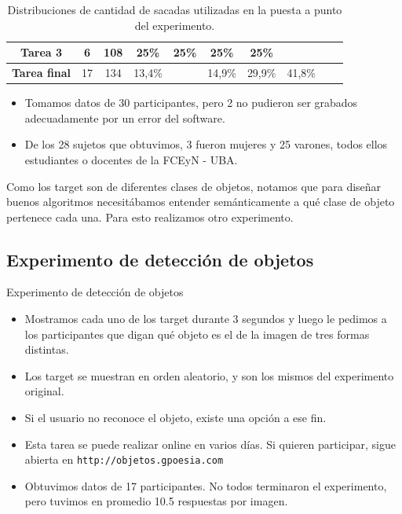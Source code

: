 \documentclass[compress]{beamer}
\begin{document}
\begin{frame}
\begin{table}[h]
\begin{tabular}{c|c|c|c|c|c|c|c|c|c|}
\multicolumn{1}{|c|}{\textbf{Tarea 3}}     & 6                                                                                        & 108                                                                                                  & 25\%       & 25\%       & 25\%       & 25\%       &             &             &             \\ \hline
\multicolumn{1}{|c|}{\textbf{Tarea final}} & 17                                                                                       & 134                                                                                                  & 13,4\%    &            & 14,9\%    & 29,9\%    & 41,8\%     &             &             \\ \hline
\end{tabular}
\caption{\label{tab:tareas} Distribuciones de cantidad de sacadas utilizadas en la puesta a punto del experimento.}
\end{table}


\end{frame}


\begin{frame}
\begin{itemize}
\item Tomamos datos de 30 participantes, pero 2 no pudieron ser grabados adecuadamente por un error del software.
\item De los 28 sujetos que obtuvimos, 3 fueron mujeres y 25 varones, todos ellos estudiantes o docentes de la FCEyN - UBA.
\end{itemize}

\bigskip
\bigskip

Como los target son de diferentes clases de objetos, notamos que para diseñar buenos algoritmos necesitábamos entender semánticamente a qué clase de objeto pertenece cada una. Para esto realizamos otro experimento.
\end{frame}

\subsection{Experimento de detección de objetos}
\begin{frame}{Experimento de detección de objetos}
\begin{itemize}
\item Mostramos cada uno de los target durante 3 segundos y luego le pedimos a los participantes que digan qué objeto es el de la imagen de tres formas distintas.
\item Los target se muestran en orden aleatorio, y son los mismos del experimento original.
\item Si el usuario no reconoce el objeto, existe una opción a ese fin.
\item Esta tarea se puede realizar online en varios días. Si quieren participar, sigue abierta en \texttt{http://objetos.gpoesia.com}
\item Obtuvimos datos de 17 participantes. No todos terminaron el experimento, pero tuvimos en promedio 10.5 respuestas por imagen.
\end{itemize}
\end{frame}
\end{document}
